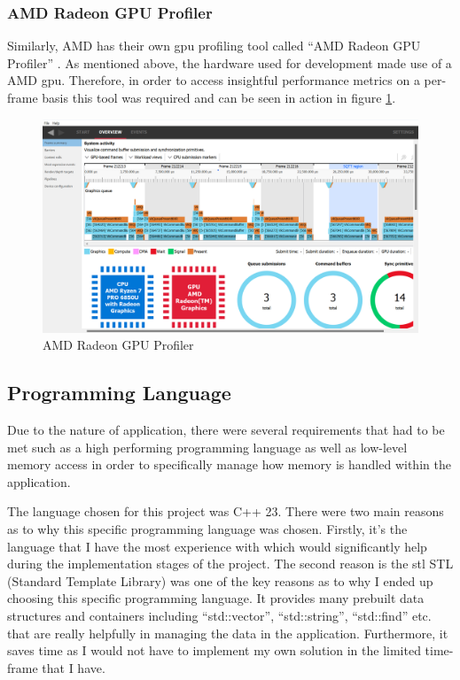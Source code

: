 \documentclass[11pt]{article}
\begin{document}
\subsubsection{AMD Radeon GPU Profiler}
Similarly, AMD has their own \gls{gpu} profiling tool called ``AMD Radeon GPU
Profiler'' \cite{rgp}. As mentioned above, the hardware used for development
made use of a AMD \gls{gpu}. Therefore, in order to access insightful
performance metrics on a per-frame basis this tool was required and can be 
seen in action in figure \ref{fig:amd_profiler}.

\begin{figure}[h!]
  \centering
  \includegraphics[width=\textwidth]{images/amd_profiler.png}
  \caption{AMD Radeon GPU Profiler}
  \label{fig:amd_profiler}
\end{figure}


\subsection{Programming Language}
Due to the nature of application, there were several requirements that had to be
met such as a high performing programming language as well as low-level memory
access in order to specifically manage how memory is handled within the
application.

The language chosen for this project was C++ 23.  There were two main reasons
as to why this specific programming language was chosen. Firstly, it's the language
that I have the most experience with which would significantly help during the 
implementation stages of the project. The second reason is the \gls{stl} STL (Standard
Template Library) was one of the key reasons as to why I ended up
choosing this specific programming language. It provides many prebuilt
data structures and containers including ``std::vector'', ``std::string'',
``std::find'' etc. that are really helpfully in managing the data in the application.
Furthermore, it saves time as I would not have to implement my own solution
in the limited time-frame that I have.
\end{document}
